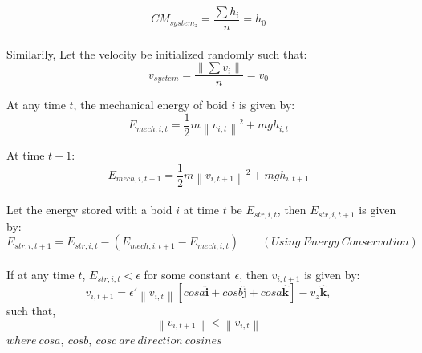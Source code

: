 \documentclass[a4paper]{article}
\newcommand\norm[1]{\left\lVert#1\right\rVert}
\newcommand{\uvec}[1]{\boldsymbol{\hat{{#1}}}}
\begin{document}
\[ CM_{system_{z}} = \frac{\sum h_{i}}{n} = h_{0}\]
\\
\noindent Similarily, Let the velocity be initialized randomly such that:
\[ v_{system} = \frac{\norm{\sum v_{i}}}{n} = v_{0} \] 

\noindent At any time $t$, the mechanical energy of boid $i$ is given by:
\[E_{mech, i, t} = \frac{1}{2} m \norm{v_{i, t}}^2 + mgh_{i,t}\] 

\noindent At time $t+1$:
\[E_{mech, i, t+1} = \frac{1}{2} m \norm{v_{i, t+1}}^2 + mgh_{i, t+1}\] 
\\
\noindent Let the energy stored with a boid $i$ at time $t$ be $E_{str, i, t}$, then $E_{str, i, t+1}$ is given by:
\\
\[ E_{str, i, t+1} = E_{str, i, t} - (E_{mech, i, t+1} - E_{mech, i, t}) \qquad (Using\ Energy\ Conservation) \]
\\
\noindent If at any time $t$, $E_{str, i, t} < \epsilon$ for some constant $\epsilon$, then $v_{i,t+1}$ is given by:
\[ v_{i,t+1} = \epsilon' \norm{v_{i,t}}[cosa \uvec{i} + cosb \uvec{j} + cosa \uvec{k}] - v_{z} \uvec{k}, \]
such that,
\[ \norm{v_{i,t+1}} < \norm{v_{i,t}} \] 
$where \ cosa,\ cosb,\ cosc\ are\ direction\ cosines$
%
%
%
%
%
%
%
%
%
\end{document}
